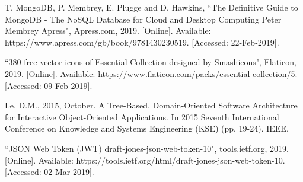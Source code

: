 \documentclass{article}
\begin{document}
\begin{thebibliography}{99}
 T. MongoDB, P. Membrey, E. Plugge and D. Hawkins, ``The Definitive Guide to MongoDB - The NoSQL Database for Cloud and Desktop Computing Peter Membrey Apress", Apress.com, 2019. [Online]. Available: https://www.apress.com/gb/book/9781430230519. [Accessed: 22-Feb-2019].

 ``380 free vector icons of Essential Collection designed by Smashicons", Flaticon, 2019. [Online]. Available: https://www.flaticon.com/packs/essential-collection/5. [Accessed: 09-Feb-2019].

 Le, D.M., 2015, October. A Tree-Based, Domain-Oriented Software Architecture for Interactive Object-Oriented Applications. In 2015 Seventh International Conference on Knowledge and Systems Engineering (KSE) (pp. 19-24). IEEE.

 ``JSON Web Token (JWT) draft-jones-json-web-token-10", tools.ietf.org, 2019. [Online]. Available: https://tools.ietf.org/html/draft-jones-json-web-token-10. [Accessed: 02-Mar-2019].

\end{thebibliography} 
\end{document}
